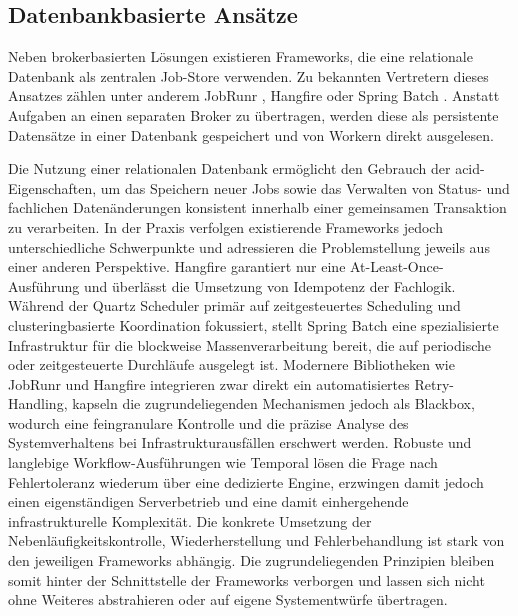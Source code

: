 \subsection{Datenbankbasierte Ansätze}
\label{subsec:datenbankbasierteAnsaetze}
Neben brokerbasierten Lösungen existieren Frameworks, die eine relationale Datenbank als zentralen Job-Store verwenden.
Zu bekannten Vertretern dieses Ansatzes zählen unter anderem JobRunr \parencite{rosoco_bv_hrsg_jobrunr_2026}, Hangfire
\parencite{hangfire_ou_hrsg_hangfire_2026} oder Spring Batch \parencite{broadcom_inc_hrsg_spring_2026}.
Anstatt Aufgaben an einen separaten Broker zu übertragen, werden diese als persistente Datensätze in einer Datenbank
gespeichert und von Workern direkt ausgelesen.

Die Nutzung einer relationalen Datenbank ermöglicht den Gebrauch der \gls{acid}-Eigenschaf\-ten, um das Speichern neuer Jobs
sowie das Verwalten von Status- und fachlichen Datenänderungen konsistent innerhalb einer gemeinsamen Transaktion zu verarbeiten.
In der Praxis verfolgen existierende Frameworks jedoch unterschiedliche Schwerpunkte und adressieren die Problemstellung
jeweils aus einer anderen Perspektive.
Hangfire garantiert nur eine At-Least-Once-Ausführung und überlässt die Umsetzung von Idempotenz der Fachlogik.
Während der Quartz Scheduler \parencite{terracotta_inc_hrsg_quartz_2026} primär auf zeitgesteuertes Scheduling und
clusteringbasierte Koordination fokussiert, stellt Spring Batch eine spezialisierte Infrastruktur für die blockweise Massenverarbeitung
bereit, die auf periodische oder zeitgesteuerte Durchläufe ausgelegt ist.
Modernere Bibliotheken wie JobRunr und Hangfire integrieren zwar direkt ein automatisiertes Retry-Handling, kapseln
die zugrundeliegenden Mechanismen jedoch als Blackbox, wodurch eine feingranulare Kontrolle und die präzise Analyse des
Systemverhaltens bei Infrastrukturausfällen erschwert werden.
Robuste und langlebige Workflow-Ausführungen wie Temporal \parencite{temporal_technologies_inc_temporal_2026} lösen die Frage
nach Fehlertoleranz wiederum über eine dedizierte Engine, erzwingen damit jedoch einen eigenständigen Serverbetrieb und eine
damit einhergehende infrastrukturelle Komplexität.
Die konkrete Umsetzung der Nebenläufigkeitskontrolle, Wiederherstellung und Fehlerbehandlung ist stark von den jeweiligen Frameworks abhängig.
Die zugrundeliegenden Prinzipien bleiben somit hinter der Schnittstelle der Frameworks verborgen und lassen sich nicht ohne
Weiteres abstrahieren oder auf eigene Systementwürfe übertragen.

